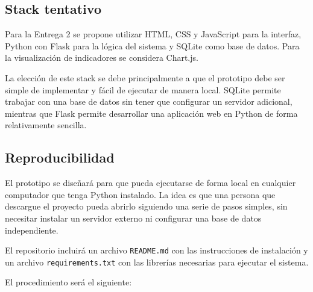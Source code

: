 \documentclass[11pt,letterpaper]{article}
\begin{document}
\subsection{Stack tentativo}

Para la Entrega 2 se propone utilizar HTML, CSS y JavaScript para la interfaz, Python con Flask para la lógica del sistema y SQLite como base de datos. Para la visualización de indicadores se considera Chart.js.

La elección de este stack se debe principalmente a que el prototipo debe ser simple de implementar y fácil de ejecutar de manera local. SQLite permite trabajar con una base de datos sin tener que configurar un servidor adicional, mientras que Flask permite desarrollar una aplicación web en Python de forma relativamente sencilla.

\subsection{Reproducibilidad}

El prototipo se diseñará para que pueda ejecutarse de forma local en cualquier computador que tenga Python instalado. La idea es que una persona que descargue el proyecto pueda abrirlo siguiendo una serie de pasos simples, sin necesitar instalar un servidor externo ni configurar una base de datos independiente.

El repositorio incluirá un archivo \texttt{README.md} con las instrucciones de instalación y un archivo \texttt{requirements.txt} con las librerías necesarias para ejecutar el sistema.

El procedimiento será el siguiente:
\end{document}
